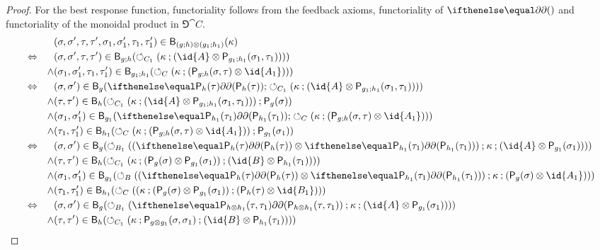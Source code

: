 \begin{proof}
For the best response function, functoriality follows from the feedback axioms, functoriality of \(\delay\) and functoriality of the monoidal product in \(\Game{\cat{C}}\).
\begin{align*} &&&(\sigma,\sigma',\tau,\tau',\sigma_1,\sigma'_1,\tau_1,\tau'_1) \in \best{(g \dcomp h) \tensor (g_1 \dcomp h_1)}(\kappa) \\
&\iff &&(\sigma,\sigma',\tau,\tau') \in \best{g \dcomp h}(\fbk[C_1](\kappa \dcomp (\id{A} \tensor \play{g_1 \dcomp h_1}(\sigma_1,\tau_1)))) \\
&&\land& (\sigma_1,\sigma'_1,\tau_1,\tau'_1) \in \best{g_1 \dcomp h_1}(\fbk[C](\kappa \dcomp (\play{g \dcomp h}(\sigma,\tau) \tensor \id{A_1}))) \\
&\iff &&(\sigma,\sigma') \in \best{g}(\delay[\play{h}(\tau)] \dcomp \fbk[C_1](\kappa \dcomp (\id{A} \tensor \play{g_1 \dcomp h_1}(\sigma_1,\tau_1)))) \\
&&\land& (\tau,\tau') \in \best{h}(\fbk[C_1](\kappa \dcomp (\id{A} \tensor \play{g_1 \dcomp h_1}(\sigma_1,\tau_1))) \dcomp \play{g}(\sigma)) \\
&&\land& (\sigma_1,\sigma'_1) \in \best{g_1}(\delay[\play{h_1}(\tau_1)] \dcomp \fbk[C](\kappa \dcomp (\play{g \dcomp h}(\sigma,\tau) \tensor \id{A_1}))) \\
&&\land& (\tau_1,\tau'_1) \in \best{h_1}(\fbk[C](\kappa \dcomp (\play{g \dcomp h}(\sigma,\tau) \tensor \id{A_1})) \dcomp \play{g_1}(\sigma_1))\\
&\iff &&(\sigma,\sigma') \in \best{g}(\fbk[B_1]((\delay[\play{h}(\tau)] \tensor \delay[\play{h_1}(\tau_1)]) \dcomp \kappa \dcomp (\id{A} \tensor \play{g_1}(\sigma_1)))) \\
&&\land& (\tau,\tau') \in \best{h}(\fbk[C_1](\kappa \dcomp (\play{g}(\sigma) \tensor \play{g_1}(\sigma_1)) \dcomp (\id{B} \tensor \play{h_1}(\tau_1)))) \\
&&\land& (\sigma_1,\sigma'_1) \in \best{g_1}(\fbk[B]((\delay[\play{h}(\tau)] \tensor \delay[\play{h_1}(\tau_1)])\dcomp \kappa \dcomp (\play{g}(\sigma) \tensor \id{A_1}))) \\
&&\land& (\tau_1,\tau'_1) \in \best{h_1}(\fbk[C]((\kappa \dcomp (\play{g}(\sigma) \tensor \play{g_1}(\sigma_1)) \dcomp (\play{h}(\tau) \tensor \id{B_1})))\\
&\iff &&(\sigma,\sigma') \in \best{g}(\fbk[B_1](\delay[\play{h \tensor h_1}(\tau,\tau_1)] \dcomp \kappa \dcomp (\id{A} \tensor \play{g_1}(\sigma_1)))) \\
&&\land& (\tau,\tau') \in \best{h}(\fbk[C_1](\kappa \dcomp \play{g \tensor g_1}(\sigma,\sigma_1) \dcomp (\id{B} \tensor \play{h_1}(\tau_1)))) \\

\end{align*}
\end{proof}

